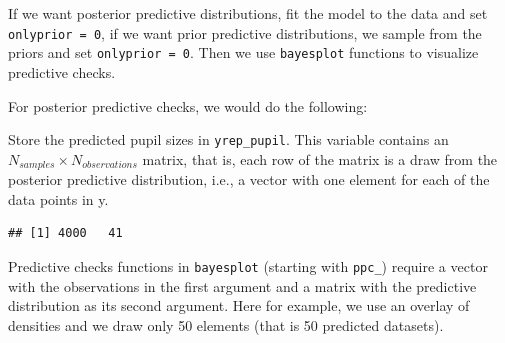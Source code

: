\documentclass[12pt,]{krantz}
\newenvironment{Shaded}{\begin{snugshade}}{\end{snugshade}}
\newcommand{\DataTypeTok}[1]{\textcolor[rgb]{0.13,0.29,0.53}{#1}}
\newcommand{\DecValTok}[1]{\textcolor[rgb]{0.00,0.00,0.81}{#1}}
\newcommand{\KeywordTok}[1]{\textcolor[rgb]{0.13,0.29,0.53}{\textbf{#1}}}
\newcommand{\NormalTok}[1]{#1}
\newcommand{\OperatorTok}[1]{\textcolor[rgb]{0.81,0.36,0.00}{\textbf{#1}}}
\newcommand{\StringTok}[1]{\textcolor[rgb]{0.31,0.60,0.02}{#1}}
\theoremstyle{definition}
\theoremstyle{definition}
\theoremstyle{definition}
\theoremstyle{remark}
\begin{document}
If we want posterior predictive distributions, fit the model to the data and set \texttt{onlyprior\ =\ 0}, if we want prior predictive distributions, we sample from the priors and set \texttt{onlyprior\ =\ 0}. Then we use \texttt{bayesplot} functions to visualize predictive checks.

For posterior predictive checks, we would do the following:

\begin{Shaded}
\end{Shaded}

Store the predicted pupil sizes in \texttt{yrep\_pupil}. This variable contains an \(N_{samples} \times N_{observations}\) matrix, that is, each row of the matrix is a draw from the posterior predictive distribution, i.e., a vector with one element for each of the data points in y.

\begin{Shaded}
\end{Shaded}

\begin{verbatim}
## [1] 4000   41
\end{verbatim}

Predictive checks functions in \texttt{bayesplot} (starting with \texttt{ppc\_}) require a vector with the observations in the first argument and a matrix with the predictive distribution as its second argument. Here for example, we use an overlay of densities and we draw only 50 elements (that is 50 predicted datasets).
\end{document}
